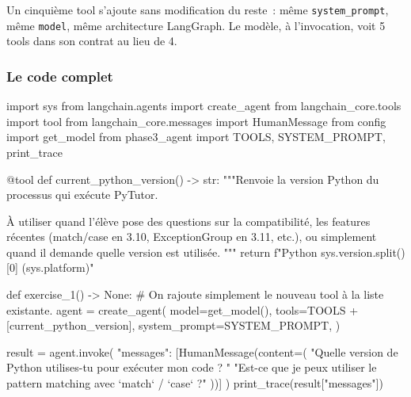 \documentclass[11pt,a4paper]{article}
\begin{document}
\begin{center}
\end{center}

Un cinquième tool s'ajoute sans modification du reste~: même
\texttt{system\_prompt}, même \texttt{model}, même architecture
LangGraph. Le modèle, à l'invocation, voit 5 tools dans son contrat au
lieu de 4.

\subsubsection{Le code complet}

\begin{pythoncode}
import sys
from langchain.agents import create_agent
from langchain_core.tools import tool
from langchain_core.messages import HumanMessage
from config import get_model
from phase3_agent import TOOLS, SYSTEM_PROMPT, print_trace


@tool
def current_python_version() -> str:
    """Renvoie la version Python du processus qui exécute PyTutor.

    À utiliser quand l'élève pose des questions sur la compatibilité, les
    features récentes (match/case en 3.10, ExceptionGroup en 3.11, etc.),
    ou simplement quand il demande quelle version est utilisée.
    """
    return f"Python {sys.version.split()[0]} ({sys.platform})"


def exercise_1() -> None:
    # On rajoute simplement le nouveau tool à la liste existante.
    agent = create_agent(
        model=get_model(),
        tools=TOOLS + [current_python_version],
        system_prompt=SYSTEM_PROMPT,
    )

    result = agent.invoke({
        "messages": [HumanMessage(content=(
            "Quelle version de Python utilises-tu pour exécuter mon code ? "
            "Est-ce que je peux utiliser le pattern matching avec `match` / `case` ?"
        ))]
    })
    print_trace(result["messages"])
\end{pythoncode}
\end{document}
